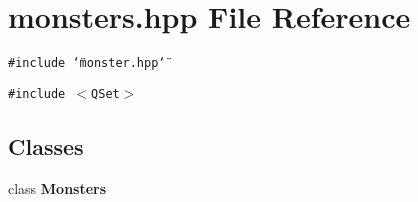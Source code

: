 \section{monsters.hpp File Reference}
\label{monsters_8hpp}
{\tt \#include \char`\"{}monster.hpp\char`\"{}}\par
{\tt \#include $<$QSet$>$}\par
\subsection*{Classes}
\begin{CompactItemize}
\item 
class {\bf Monsters}
\end{CompactItemize}
